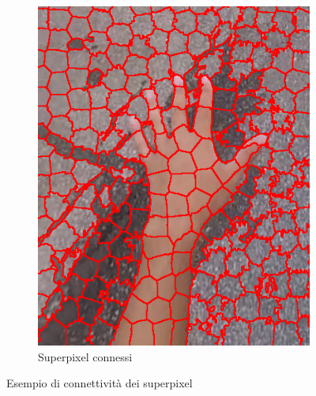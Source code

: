 \documentclass[12pt,a4paper,oneside]{article}
\begin{document}
\begin{figure}[!htb]
\begin{subfigure}[t]{.495\textwidth}
		\includegraphics[width=\textwidth]{resources/images/connectivity_yes.png}
		\caption{Superpixel connessi}
	\end{subfigure}%
	\caption{Esempio di connettività dei superpixel}\label{es_connectivity}
\end{figure}
\end{document}
